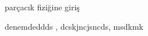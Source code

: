 \begin{thebibliography}{9}

  parçacık fiziğine giriş
  
	denemdeddds ,
	dcskjncjsncds,
	msdkmk
\end{thebibliography}
